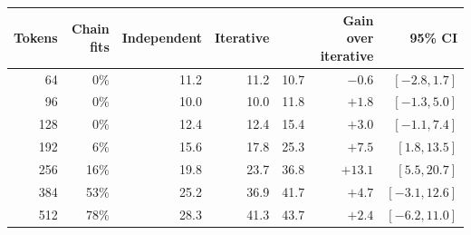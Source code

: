 \begin{tabular}{@{}rrrrrrr@{}}
\toprule
Tokens & Chain fits & Independent & Iterative & \proofkv{} & Gain over iterative & 95\% CI \\
\midrule
64 & 0\% & 11.2 & 11.2 & 10.7 & $-0.6$ & $[-2.8,1.7]$ \\
96 & 0\% & 10.0 & 10.0 & 11.8 & $+1.8$ & $[-1.3,5.0]$ \\
128 & 0\% & 12.4 & 12.4 & 15.4 & $+3.0$ & $[-1.1,7.4]$ \\
192 & 6\% & 15.6 & 17.8 & 25.3 & $+7.5$ & $[1.8,13.5]$ \\
256 & 16\% & 19.8 & 23.7 & 36.8 & $+13.1$ & $[5.5,20.7]$ \\
384 & 53\% & 25.2 & 36.9 & 41.7 & $+4.7$ & $[-3.1,12.6]$ \\
512 & 78\% & 28.3 & 41.3 & 43.7 & $+2.4$ & $[-6.2,11.0]$ \\
\bottomrule
\end{tabular}
